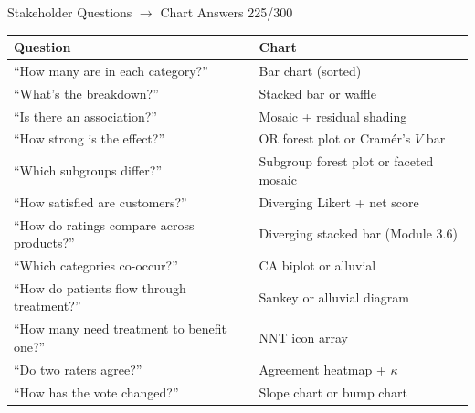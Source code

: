 \documentclass[10pt]{beamer}
\newcommand{\smark}[1]{\hfill{\scriptsize\color{codegray}#1}}
\begin{document}
\begin{frame}{Stakeholder Questions $\to$ Chart Answers}
\smark{225/300}
\centering\scriptsize
\begin{tabular}{@{}ll@{}}
    \toprule
    \textbf{Question} & \textbf{Chart} \\
    \midrule
    ``How many are in each category?''            & Bar chart (sorted) \\
    ``What's the breakdown?''                     & Stacked bar or waffle \\
    ``Is there an association?''                   & Mosaic + residual shading \\
    ``How strong is the effect?''                  & OR forest plot or Cramér's $V$ bar \\
    ``Which subgroups differ?''                    & Subgroup forest plot or faceted mosaic \\
    ``How satisfied are customers?''               & Diverging Likert + net score \\
    ``How do ratings compare across products?''    & Diverging stacked bar (Module 3.6) \\
    ``Which categories co-occur?''                 & CA biplot or alluvial \\
    ``How do patients flow through treatment?''    & Sankey or alluvial diagram \\
    ``How many need treatment to benefit one?''    & NNT icon array \\
    ``Do two raters agree?''                       & Agreement heatmap + $\kappa$ \\
    ``How has the vote changed?''                  & Slope chart or bump chart \\
    \bottomrule
\end{tabular}
\end{frame}
\end{document}
